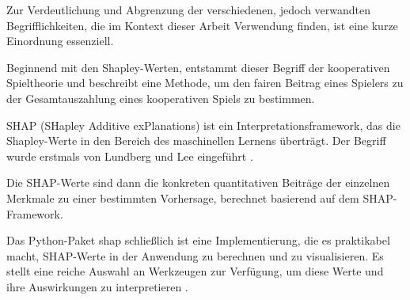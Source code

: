 Zur Verdeutlichung und Abgrenzung der verschiedenen, jedoch verwandten Begrifflichkeiten, die im Kontext dieser Arbeit Verwendung finden, 
ist eine kurze Einordnung essenziell.

Beginnend mit den Shapley-Werten, entstammt dieser Begriff der kooperativen Spieltheorie und beschreibt eine Methode, 
um den fairen Beitrag eines Spielers zu der Gesamtauszahlung eines kooperativen Spiels zu bestimmen. 

SHAP (SHapley Additive exPlanations) ist ein Interpretationsframework, das die Shapley-Werte in den Bereich des maschinellen Lernens überträgt. 
Der Begriff wurde erstmals von Lundberg und Lee eingeführt \cite[S. 1]{NIPS2017_8a20a862}.

Die SHAP-Werte sind dann die konkreten quantitativen Beiträge der einzelnen Merkmale zu einer bestimmten Vorhersage, berechnet basierend auf dem SHAP-Framework.

Das Python-Paket \textsf{shap} schließlich ist eine Implementierung, die es praktikabel macht, SHAP-Werte in der Anwendung zu berechnen 
und zu visualisieren. Es stellt eine reiche Auswahl an Werkzeugen zur Verfügung, um diese Werte und ihre Auswirkungen zu interpretieren \cite[S. 14]{Molnar_2023}.